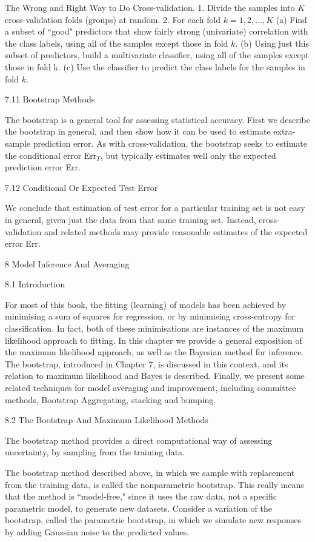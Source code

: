 The Wrong and Right Way to Do Cross-validation. 1. Divide the samples into $K$ cross-validation folds (groups) at random. 2. For each fold $k=1,2,\dots ,K$ (a) Find a subset of ``good" predictors that show fairly strong (univariate) correlation with the class labels, using all of the samples except those in fold $k$. (b) Using just this subset of predictors, build a multivariate classifier, using all of the samples except those in fold k. (c) Use the classifier to predict the class labels for the samples in fold $k$.

7.11 Bootstrap Methods

The bootstrap is a general tool for assessing statistical accuracy. First we describe the bootstrap in general, and then show how it can be used to estimate extra-sample prediction error. As with cross-validation, the bootstrap seeks to estimate the conditional error $\text{Err}_T$, but typically estimates well only the expected prediction error Err.

7.12 Conditional Or Expected Test Error

We conclude that estimation of test error for a particular training set is not easy in general, given just the data from that same training set. Instead, cross-validation and related methods may provide reasonable estimates of the expected error Err.

8 Model Inference And Averaging

8.1 Introduction

For most of this book, the fitting (learning) of models has been achieved by minimising a sum of squares for regression, or by minimising cross-entropy for classification. In fact, both of these minimisations are instances of the maximum likelihood approach to fitting. In this chapter we provide a general exposition of the maximum likelihood approach, as well as the Bayesian method for inference. The bootstrap, introduced in Chapter 7, is discussed in this context, and its relation to maximum likelihood and Bayes is described. Finally, we present some related techniques for model averaging and improvement, including committee methods, Bootstrap Aggregating, stacking and bumping.

8.2 The Bootstrap And Maximum Likelihood Methods

The bootstrap method provides a direct computational way of assessing uncertainty, by sampling from the training data.

The bootstrap method described above, in which we sample with replacement from the training data, is called the nonparametric bootstrap. This really means that the method is ``model-free," since it uses the raw data, not a specific parametric model, to generate new datasets. Consider a variation of the bootstrap, called the parametric bootstrap, in which we simulate new responses by adding Gaussian noise to the predicted values.

